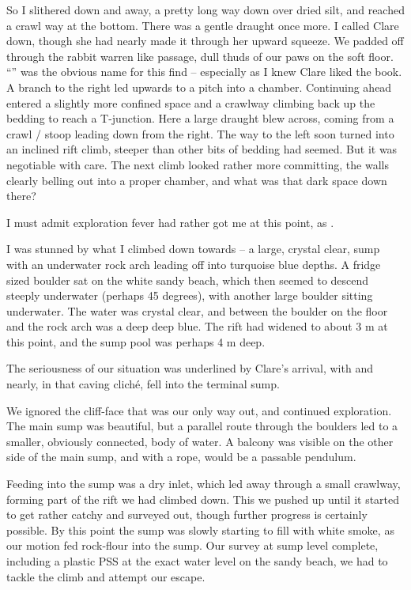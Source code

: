So I slithered down and away, a pretty long way down over dried silt,
and reached a crawl way at the bottom. There was a gentle draught once
more. I called Clare down, though she had nearly made it through her
upward squeeze. We padded off through the rabbit warren like passage,
dull thuds of our paws on the soft floor. ``'' was
the obvious name for this find -- especially as I knew Clare liked the
book. A branch to the right led upwards to a pitch into a chamber.
Continuing ahead entered a slightly more confined space and a crawlway
climbing back up the bedding to reach a T-junction. Here a large draught
blew across, coming from a crawl / stoop leading down from the right.
The way to the left soon turned into an inclined rift climb, steeper
than other bits of bedding had seemed. But it was negotiable with
care. The next climb looked rather more committing, the walls clearly
belling out into a proper chamber, and what was that dark space down
there?

I must admit exploration fever had rather got me at this point, as . 

I was
stunned by what I climbed down towards -- a large, crystal clear, sump
with an underwater rock arch leading off into turquoise blue depths. 
A fridge sized boulder sat on the white sandy beach, which then seemed to descend steeply underwater (perhaps 45 degrees), with another large boulder sitting underwater. 
The water was crystal clear, and between the boulder on the floor and the rock arch was a deep deep blue. 
The rift had widened to about 3 m at this point, and the sump pool was perhaps 4 m deep. 

The
seriousness of our situation was underlined by Clare's arrival, with  and nearly,
in that caving cliché, fell into the terminal sump.

We ignored the cliff-face that was our only way out, and continued
exploration. The main sump was beautiful, but a parallel route through
the boulders led to a smaller, obviously connected, body of water. A balcony was visible on the other side of the main sump, and with a rope,
would be a passable pendulum. 

Feeding into the sump was a dry inlet,
which led away through a small crawlway, forming part of the rift we had climbed down. 
This we pushed up until it started
to get rather catchy and surveyed out, though further progress is
certainly possible. 
By this point the sump was slowly starting to fill with white smoke, as our motion fed rock-flour into the sump. 
Our survey at sump level complete, including a plastic
PSS at the exact water level on the sandy beach, we had to tackle the climb and attempt our escape. 

